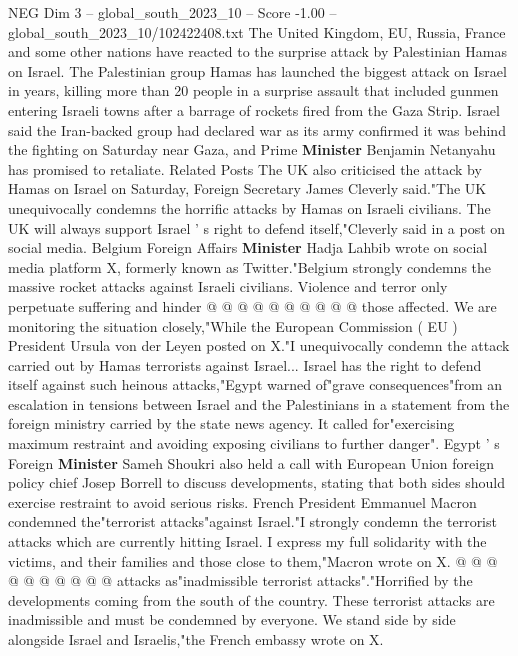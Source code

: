 \begin{textsample}{NEG Dim 3 – global\_south\_2023\_10 – Score -1.00 – global\_south\_2023\_10/102422408.txt}  \label{ex:f3_neg_021}
The United Kingdom, EU, Russia, France and some other nations have reacted to the surprise attack by Palestinian Hamas on Israel.
The Palestinian group Hamas has launched the biggest attack on Israel in years, killing more than 20 people in a surprise assault that included gunmen entering Israeli towns after a barrage of rockets fired from the Gaza Strip.
Israel said the Iran-backed group had declared war as its army confirmed it was behind the fighting on Saturday near Gaza, and Prime \textbf{Minister} Benjamin Netanyahu has promised to retaliate.
Related Posts The UK also criticised the attack by Hamas on Israel on Saturday, Foreign Secretary James Cleverly said."The UK unequivocally condemns the horrific attacks by Hamas on Israeli civilians.
The UK will always support Israel ' s right to defend itself,"Cleverly said in a post on social media.
Belgium Foreign Affairs \textbf{Minister} Hadja Lahbib wrote on social media platform X, formerly known as Twitter."Belgium strongly condemns the massive rocket attacks against Israeli civilians.
Violence and terror only perpetuate suffering and hinder @ @ @ @ @ @ @ @ @ @ those affected.
We are monitoring the situation closely,"While the European Commission ( EU ) President Ursula von der Leyen posted on X."I unequivocally condemn the attack carried out by Hamas terrorists against Israel...
Israel has the right to defend itself against such heinous attacks,"Egypt warned of"grave consequences"from an escalation in tensions between Israel and the Palestinians in a statement from the foreign ministry carried by the state news agency.
It called for"exercising maximum restraint and avoiding exposing civilians to further danger".
Egypt ' s Foreign \textbf{Minister} Sameh Shoukri also held a call with European Union foreign policy chief Josep Borrell to discuss developments, stating that both sides should exercise restraint to avoid serious risks.
French President Emmanuel Macron condemned the"terrorist attacks"against Israel."I strongly condemn the terrorist attacks which are currently hitting Israel.
I express my full solidarity with the victims, and their families and those close to them,"Macron wrote on X. @ @ @ @ @ @ @ @ @ @ attacks as"inadmissible terrorist attacks"."Horrified by the developments coming from the south of the country.
These terrorist attacks are inadmissible and must be condemned by everyone.
We stand side by side alongside Israel and Israelis,"the French embassy wrote on X.

\end{textsample}

